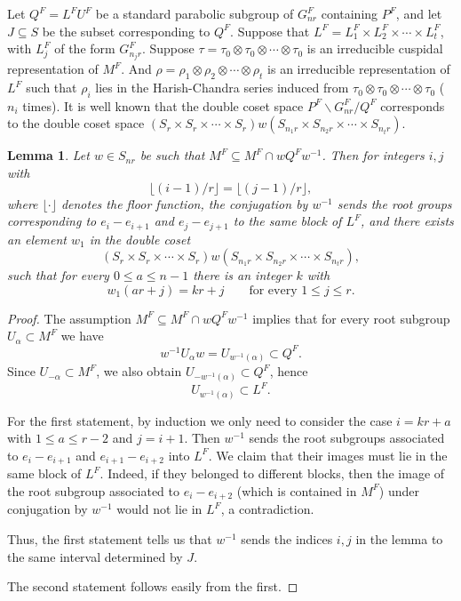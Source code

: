 \documentclass[12pt]{article}
\newtheorem{lemma}[theorem]{Lemma}
\theoremstyle{remark}
\begin{document}
Let $Q^F = L^F U^F$ be a standard parabolic subgroup of $G_{nr}^F$ containing $P^F$, and let $J\subseteq S$ be the subset corresponding to $Q^F$. Suppose that $L^F=L_1^F \times L_2^F \times \cdots \times L_t^F$, with $L_j^F$ of the form $G_{n_jr}^F$. Suppose $\tau=\tau_0 \otimes \tau_0 \otimes \cdots \otimes \tau_0$ is an irreducible cuspidal representation of $M^F$. And $\rho=\rho_1 \otimes \rho_2 \otimes \cdots \otimes \rho_t$ is an irreducible representation of $L^F$ such that $\rho_i$ lies in the Harish-Chandra series induced from $\tau_0 \otimes \tau_0 \otimes \cdots \otimes \tau_0$ ($n_i$ times). It is well known that the double coset space $P^F \backslash G_{nr}^F /Q^F$ corresponds to the double coset space $(S_r \times S_r \times \cdots \times S_r)  w (S_{n_1r} \times S_{n_2r} \times \cdots \times S_{n_tr})$.

\begin{lemma}
Let $w \in S_{nr}$ be such that $M^F \subseteq M^F \cap wQ^Fw^{-1}$. Then for integers $i,j$ with
\[
\bigl\lfloor (i-1)/r \bigr\rfloor = \bigl\lfloor (j-1)/r \bigr\rfloor,
\]
where $\lfloor\cdot\rfloor$ denotes the floor function,  the conjugation by $w^{-1}$ sends the root groups corresponding to $e_i-e_{i+1}$ and $e_j-e_{j+1}$ to the same block of $L^F$, and there exists an element $w_1$ in the double coset
\[
(S_r \times S_r \times \cdots \times S_r)w (S_{n_1r} \times S_{n_2r} \times \cdots \times S_{n_tr}),
\]
such that for every $0 \le a \le n-1$ there is an integer $k$ with
\[
w_1(ar + j) = kr + j \qquad \text{for every } 1 \le j \le r.
\]
\end{lemma}

\begin{proof}
The assumption $M^F \subseteq M^F \cap wQ^Fw^{-1}$ implies that for every root subgroup $U_\alpha \subset M^F$ we have
\[
w^{-1}U_\alpha w = U_{w^{-1}(\alpha)} \subset Q^F.
\]
Since $U_{-\alpha} \subset M^F$, we also obtain $U_{-w^{-1}(\alpha)} \subset Q^F$, hence
\[
U_{w^{-1}(\alpha)} \subset L^F.
\]

For the first statement, by induction we only need to consider the case
$i = kr + a$ with $1 \le a \le r-2$ and $j = i+1$. Then $w^{-1}$ sends the root subgroups associated to $e_i - e_{i+1}$ and $e_{i+1} - e_{i+2}$ into $L^F$. We claim that their images must lie in the same block of $L^F$. Indeed, if they belonged to different blocks, then the image of the root subgroup associated to $e_i - e_{i+2}$ (which is contained in $M^F$) under conjugation by $w^{-1}$ would not lie in $L^F$, a contradiction.

Thus, the first statement tells us that $w^{-1}$ sends the indices $i,j$ in the lemma to the same interval determined by $J$.

The second statement follows easily from the first.
\end{proof}
\end{document}
